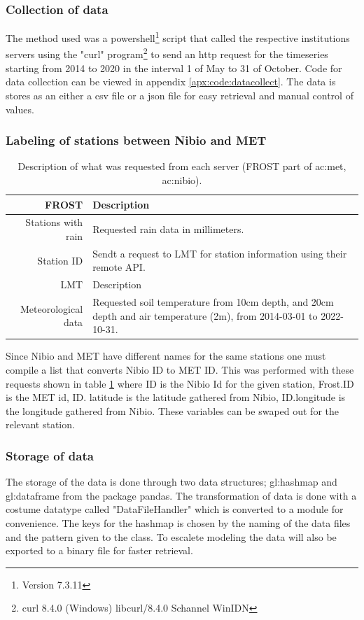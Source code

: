 \subsubsection{Collection of data}

The method used was a powershell\footnote{Version 7.3.11} script that called the respective institutions servers using the "curl" program\footnote{curl 8.4.0 (Windows) libcurl/8.4.0 Schannel WinIDN} to send an http request for the timeseries starting from 2014 to 2020 in the interval 1 of May to 31 of October. Code for data collection can be viewed in appendix \ref{apx:code:datacollect}. The data is stores as an either a csv file or a json file for easy retrieval and manual control of values.

\subsubsection{Labeling of stations between Nibio and MET}
\begin{table}
	\centering
	\begin{tabular}{r|p{5cm}|}
		FROST & Description\\\hline
		Stations with rain & Requested rain data in millimeters. \\
		Station ID & Sendt a request to LMT for station information using their remote API. \\
		\hline LMT & Description \\\hline
		Meteorological data & Requested soil temperature from 10cm depth, and 20cm depth and air temperature (2m), from 2014-03-01 to 2022-10-31.\\
	\end{tabular}
	\caption[Request to servers about stations]{Description of what was requested from each server (FROST part of \acrshort{ac:met}, \acrshort{ac:nibio}).}
	\label{tab:station_request}
\end{table}

Since Nibio and MET have different names for the same stations one must compile a list that converts Nibio ID to MET ID. This was performed with these requests shown in table \ref{tab:station_request} where ID is the Nibio Id for the given station, Frost.ID is the MET id, ID. latitude is the latitude gathered from Nibio, ID.longitude is the longitude gathered from Nibio. These variables can be swaped out for the relevant station.

\subsubsection{Storage of data}
The storage of the data is done through two data structures; \gls{gl:hashmap} and \gls{gl:dataframe} from the package pandas. The transformation of data is done with a costume datatype called "DataFileHandler" which is converted to a module for convenience. The keys for the hashmap is chosen by the naming of the data files and the pattern given to the class. To escalete modeling the data will also be exported to a binary file for faster retrieval. 

